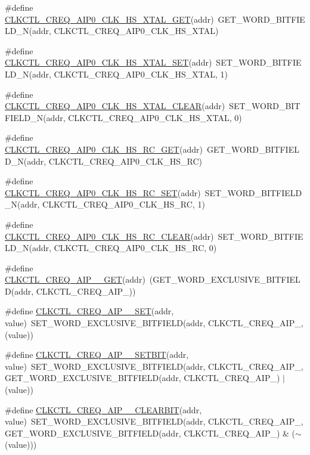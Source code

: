 \begin{DoxyCompactItemize}
\item 
\#define \hyperlink{a00544_a9f58a858c882b7919f3217512e9eeed4}{CLKCTL\_\-CREQ\_\-AIP0\_\-CLK\_\-HS\_\-XTAL\_\-GET}(addr)~GET\_\-WORD\_\-BITFIELD\_\-N(addr, CLKCTL\_\-CREQ\_\-AIP0\_\-CLK\_\-HS\_\-XTAL)
\item 
\#define \hyperlink{a00544_adaa585182fce2e93f4887a40e565cb39}{CLKCTL\_\-CREQ\_\-AIP0\_\-CLK\_\-HS\_\-XTAL\_\-SET}(addr)~SET\_\-WORD\_\-BITFIELD\_\-N(addr, CLKCTL\_\-CREQ\_\-AIP0\_\-CLK\_\-HS\_\-XTAL, 1)
\item 
\#define \hyperlink{a00544_a2cfd89c514eb3242a23ef8078426779d}{CLKCTL\_\-CREQ\_\-AIP0\_\-CLK\_\-HS\_\-XTAL\_\-CLEAR}(addr)~SET\_\-WORD\_\-BITFIELD\_\-N(addr, CLKCTL\_\-CREQ\_\-AIP0\_\-CLK\_\-HS\_\-XTAL, 0)
\item 
\#define \hyperlink{a00544_ae2c66221c3f5e08dc50f15b344677533}{CLKCTL\_\-CREQ\_\-AIP0\_\-CLK\_\-HS\_\-RC\_\-GET}(addr)~GET\_\-WORD\_\-BITFIELD\_\-N(addr, CLKCTL\_\-CREQ\_\-AIP0\_\-CLK\_\-HS\_\-RC)
\item 
\#define \hyperlink{a00544_aefdc524f10a373aa67af62123a45cd87}{CLKCTL\_\-CREQ\_\-AIP0\_\-CLK\_\-HS\_\-RC\_\-SET}(addr)~SET\_\-WORD\_\-BITFIELD\_\-N(addr, CLKCTL\_\-CREQ\_\-AIP0\_\-CLK\_\-HS\_\-RC, 1)
\item 
\#define \hyperlink{a00544_ad75f0456c3209bd439ec38f9b653e203}{CLKCTL\_\-CREQ\_\-AIP0\_\-CLK\_\-HS\_\-RC\_\-CLEAR}(addr)~SET\_\-WORD\_\-BITFIELD\_\-N(addr, CLKCTL\_\-CREQ\_\-AIP0\_\-CLK\_\-HS\_\-RC, 0)
\item 
\#define \hyperlink{a00544_ab881c8c6f37b59ffd78200ddf307677c}{CLKCTL\_\-CREQ\_\-AIP\_\_\-GET}(addr)~(GET\_\-WORD\_\-EXCLUSIVE\_\-BITFIELD(addr, CLKCTL\_\-CREQ\_\-AIP\_))
\item 
\#define \hyperlink{a00544_afac80408ed006e3c6b08452e27ac8ab4}{CLKCTL\_\-CREQ\_\-AIP\_\_\-SET}(addr, value)~SET\_\-WORD\_\-EXCLUSIVE\_\-BITFIELD(addr, CLKCTL\_\-CREQ\_\-AIP\_, (value))
\item 
\#define \hyperlink{a00544_aa28df8e2ed5a5b9746ba7a848b1dae97}{CLKCTL\_\-CREQ\_\-AIP\_\_\-SETBIT}(addr, value)~SET\_\-WORD\_\-EXCLUSIVE\_\-BITFIELD(addr, CLKCTL\_\-CREQ\_\-AIP\_, GET\_\-WORD\_\-EXCLUSIVE\_\-BITFIELD(addr, CLKCTL\_\-CREQ\_\-AIP\_) $|$ (value))
\item 
\#define \hyperlink{a00544_afef1ca02b3ca8120b39be6df9e85c119}{CLKCTL\_\-CREQ\_\-AIP\_\_\-CLEARBIT}(addr, value)~SET\_\-WORD\_\-EXCLUSIVE\_\-BITFIELD(addr, CLKCTL\_\-CREQ\_\-AIP\_, GET\_\-WORD\_\-EXCLUSIVE\_\-BITFIELD(addr, CLKCTL\_\-CREQ\_\-AIP\_) \& ($\sim$(value)))
\item 

\end{DoxyCompactItemize}

